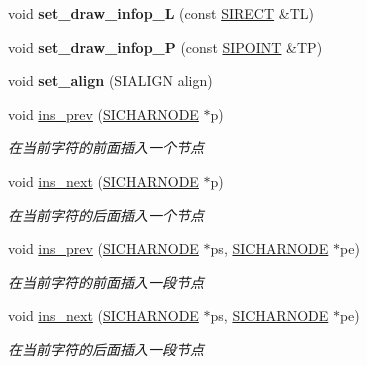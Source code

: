 \begin{DoxyCompactItemize}
void {\bfseries set\+\_\+draw\+\_\+infop\+\_\+L} (const \hyperlink{struct_s_i_r_e_c_t}{S\+I\+R\+E\+CT} \&TL)
\item 
\mbox{\label{class_s_i_c_h_a_r_n_o_d_e_a52e5c4ff341d7276063e6441452b4c3f}} 
void {\bfseries set\+\_\+draw\+\_\+infop\+\_\+P} (const \hyperlink{struct_s_i_p_o_i_n_t}{S\+I\+P\+O\+I\+NT} \&TP)
\item 
\mbox{\label{class_s_i_c_h_a_r_n_o_d_e_aa84ae4bcf6cc7eba84a0c93f3d1c6bc9}} 
void {\bfseries set\+\_\+align} (S\+I\+A\+L\+I\+GN align)
\item 
void \hyperlink{class_s_i_c_h_a_r_n_o_d_e_a0aba68c10438db18bea07bb77d70f839}{ins\+\_\+prev} (\hyperlink{class_s_i_c_h_a_r_n_o_d_e}{S\+I\+C\+H\+A\+R\+N\+O\+DE} $\ast$p)
\begin{DoxyCompactList}\small\item\em 在当前字符的前面插入一个节点~\newline
\end{DoxyCompactList}\item 
void \hyperlink{class_s_i_c_h_a_r_n_o_d_e_a9a3f1b6c50c483ad2d8a770f4590c50c}{ins\+\_\+next} (\hyperlink{class_s_i_c_h_a_r_n_o_d_e}{S\+I\+C\+H\+A\+R\+N\+O\+DE} $\ast$p)
\begin{DoxyCompactList}\small\item\em 在当前字符的后面插入一个节点~\newline
\end{DoxyCompactList}\item 
void \hyperlink{class_s_i_c_h_a_r_n_o_d_e_ae703c63e9c8e05fc6069e539fc3f6a01}{ins\+\_\+prev} (\hyperlink{class_s_i_c_h_a_r_n_o_d_e}{S\+I\+C\+H\+A\+R\+N\+O\+DE} $\ast$ps, \hyperlink{class_s_i_c_h_a_r_n_o_d_e}{S\+I\+C\+H\+A\+R\+N\+O\+DE} $\ast$pe)
\begin{DoxyCompactList}\small\item\em 在当前字符的前面插入一段节点~\newline
\end{DoxyCompactList}\item 
void \hyperlink{class_s_i_c_h_a_r_n_o_d_e_a5c7b26fb6c8d148b4bb2f81ac21939b9}{ins\+\_\+next} (\hyperlink{class_s_i_c_h_a_r_n_o_d_e}{S\+I\+C\+H\+A\+R\+N\+O\+DE} $\ast$ps, \hyperlink{class_s_i_c_h_a_r_n_o_d_e}{S\+I\+C\+H\+A\+R\+N\+O\+DE} $\ast$pe)
\begin{DoxyCompactList}\small\item\em 在当前字符的后面插入一段节点~\newline

\end{DoxyCompactList}
\end{DoxyCompactItemize}
